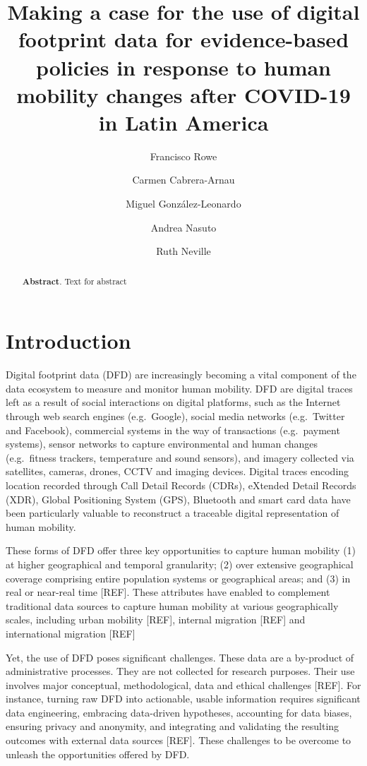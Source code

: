 \documentclass[
  10pt,
  letterpaper,
  DIV=11,
  numbers=noendperiod]{scrartcl}
\title{Making a case for the use of digital footprint data for
evidence-based policies in response to human mobility changes after
COVID-19 in Latin America}
\author{\small Francisco Rowe \and \small Carmen
Cabrera-Arnau \and \small Miguel González-Leonardo \and \small Andrea
Nasuto \and \small Ruth Neville}
\date{}
\begin{document}
\maketitle
\begin{abstract}
\textbf{Abstract}. Text for abstract
\end{abstract}
\ifdefined\Shaded\renewenvironment{Shaded}{\begin{tcolorbox}[boxrule=0pt, borderline west={3pt}{0pt}{shadecolor}, interior hidden, sharp corners, enhanced, breakable, frame hidden]}{\end{tcolorbox}}\fi

\hypertarget{introduction}{%
\section{Introduction}\label{introduction}}

Digital footprint data (DFD) are increasingly becoming a vital component
of the data ecosystem to measure and monitor human mobility. DFD are
digital traces left as a result of social interactions on digital
platforms, such as the Internet through web search engines
(e.g.~Google), social media networks (e.g.~Twitter and Facebook),
commercial systems in the way of transactions (e.g.~payment systems),
sensor networks to capture environmental and human changes (e.g.~fitness
trackers, temperature and sound sensors), and imagery collected via
satellites, cameras, drones, CCTV and imaging devices. Digital traces
encoding location recorded through Call Detail Records (CDRs), eXtended
Detail Records (XDR), Global Positioning System (GPS), Bluetooth and
smart card data have been particularly valuable to reconstruct a
traceable digital representation of human mobility.

These forms of DFD offer three key opportunities to capture human
mobility (1) at higher geographical and temporal granularity; (2) over
extensive geographical coverage comprising entire population systems or
geographical areas; and (3) in real or near-real time {[}REF{]}. These
attributes have enabled to complement traditional data sources to
capture human mobility at various geographically scales, including urban
mobility {[}REF{]}, internal migration {[}REF{]} and international
migration {[}REF{]}

Yet, the use of DFD poses significant challenges. These data are a
by-product of administrative processes. They are not collected for
research purposes. Their use involves major conceptual, methodological,
data and ethical challenges {[}REF{]}. For instance, turning raw DFD
into actionable, usable information requires significant data
engineering, embracing data-driven hypotheses, accounting for data
biases, ensuring privacy and anonymity, and integrating and validating
the resulting outcomes with external data sources {[}REF{]}. These
challenges to be overcome to unleash the opportunities offered by DFD.
\end{document}
